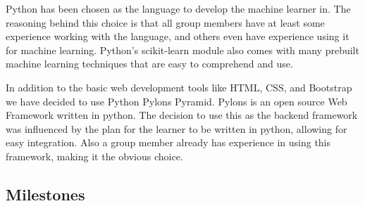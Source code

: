 \documentclass{ecmm427_assignment}
\begin{document}
 Python has been chosen as the language to develop the machine learner in. The reasoning behind this choice is that all group members have at least some experience working with the language, and others even have experience using it for machine learning. Python’s scikit-learn module also comes with many prebuilt machine learning techniques that are easy to comprehend and use.

 In addition to the basic web development tools like HTML, CSS, and Bootstrap we have decided to use Python Pylons Pyramid. Pylons is an open source Web Framework written in python. The decision to use this as the backend framework was influenced by the plan for the learner to be written in python, allowing for easy integration. Also a group member already has experience in using this framework, making it the obvious choice.

\subsection{Milestones}
\end{document}
